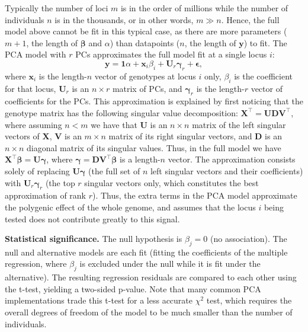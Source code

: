 \documentclass[11pt]{article}
\begin{document}
Typically the number of loci $m$ is in the order of millions while the number of individuals $n$ is in the thousands, or in other words, $m \gg n$.
Hence, the full model above cannot be fit in this typical case, as there are more parameters ($m+1$, the length of $\boldsymbol{\beta}$ and $\alpha$) than datapoints ($n$, the length of $\mathbf{y}$) to fit.
The PCA model with $r$ PCs approximates the full model fit at a single locus $i$:
\begin{equation}
  \label{eq:pca_gwas}
  \mathbf{y}
  =
  \mathbf{1} \alpha + \mathbf{x}_i \beta_i + \mathbf{U}_r \boldsymbol{\gamma}_r + \boldsymbol{\epsilon}
  ,
\end{equation}
where $\mathbf{x}_i$ is the length-$n$ vector of genotypes at locus $i$ only,
$\beta_i$ is the coefficient for that locus,
$\mathbf{U}_r$ is an $n \times r$ matrix of PCs, and
$\boldsymbol{\gamma}_r$ is the length-$r$ vector of coefficients for the PCs.
This approximation is explained by first noticing that the genotype matrix has the following singular value decomposition:
$\mathbf{X}^\intercal = \mathbf{U} \mathbf{D} \mathbf{V}^\intercal$,
where assuming $n < m$ we have that
$\mathbf{U}$ is an $n \times n$ matrix of the left singular vectors of $\mathbf{X}$,
$\mathbf{V}$ is an $m \times n$ matrix of its right singular vectors, and
$\mathbf{D}$ is an $n \times n$ diagonal matrix of its singular values.
Thus, in the full model we have
$\mathbf{X}^\intercal \boldsymbol{\beta} = \mathbf{U} \boldsymbol{\gamma}$,
where
$\boldsymbol{\gamma} = \mathbf{D} \mathbf{V}^\intercal \boldsymbol{\beta}$ is a length-$n$ vector.
The approximation consists solely of replacing $\mathbf{U} \boldsymbol{\gamma}$ (the full set of $n$ left singular vectors and their coefficients) with $\mathbf{U}_r \boldsymbol{\gamma}_r$ (the top $r$ singular vectors only, which constitutes the best approximation of rank $r$).
Thus, the extra terms in the PCA model approximate the polygenic effect of the whole genome, and assumes that the locus $i$ being tested does not contribute greatly to this signal.

\textbf{Statistical significance.}
The null hypothesis is $\beta_j = 0$ (no association).
The null and alternative models are each fit (fitting the coefficients of the multiple regression, where $\beta_j$ is excluded under the null while it is fit under the alternative).
The resulting regression residuals are compared to each other using the t-test, yielding a two-sided p-value.
Note that many common PCA implementations trade this t-test for a less accurate $\chi^2$ test, which requires the overall degrees of freedom of the model to be much smaller than the number of individuals.
\end{document}
